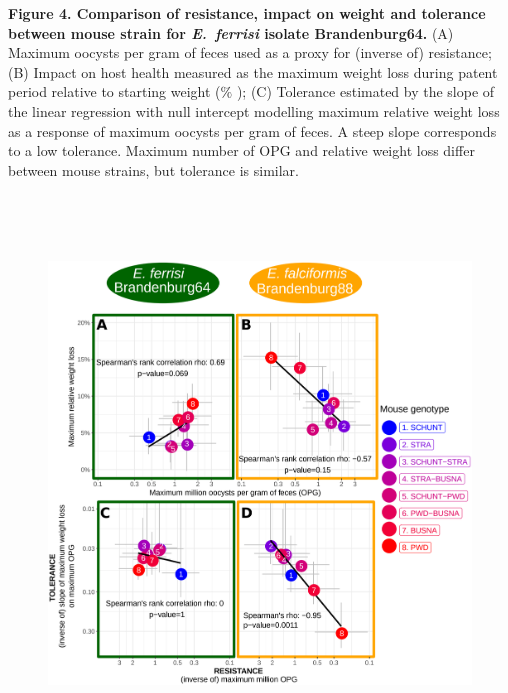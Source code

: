 \documentclass[12pt]{article}
\renewcommand{\_}{\kern-1.5pt\textunderscore\kern-1.5pt}
\begin{document}
{\fontsize{10pt}{12.0pt}\selectfont \textbf{Figure 4. Comparison of resistance, impact on weight and tolerance between mouse strain for \textit{E. ferrisi }isolate Brandenburg64. }(A) Maximum oocysts per gram of feces used as a proxy for (inverse of) resistance; (B) Impact on host health measured as the maximum weight loss during patent period relative to starting weight ($\%$ ); (C) Tolerance estimated by the slope of the linear regression with null intercept modelling maximum relative weight loss as a response of maximum oocysts per gram of feces. A steep slope corresponds to a low tolerance. \textcolor[HTML]{FF0000}{Maximum number of OPG and relative weight loss differ between mouse strains, but tolerance is similar.}\par}


\newpage
\par




\begin{figure}[H]
	\begin{Center}
		\includegraphics[width=5.8in,height=5.81in]{./media/image7.png}
	\end{Center}
\end{figure}
\end{document}
